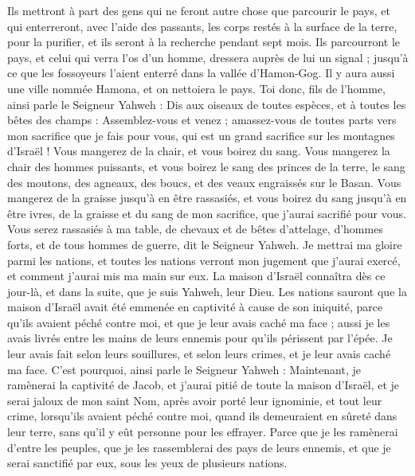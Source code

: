 \begin{multicols}{2}
Ils mettront à part des gens qui ne feront autre chose que parcourir le pays, et qui enterreront, avec l’aide des passants, les corps restés à la surface de la terre, pour la purifier, et ils seront à la recherche pendant sept mois.
Ils parcourront le pays, et celui qui verra l'os d'un homme, dressera auprès de lui un signal ; jusqu'à ce que les fossoyeurs l'aient enterré dans la vallée d'Hamon-Gog.
Il y aura aussi une ville nommée Hamona, et on nettoiera le pays.
Toi donc, fils de l’homme, ainsi parle le Seigneur Yahweh : Dis aux oiseaux de toutes espèces, et à toutes les bêtes des champs : Assemblez-vous et venez ; amassez-vous de toutes parts vers mon sacrifice que je fais pour vous, qui est un grand sacrifice sur les montagnes d'Israël ! Vous mangerez de la chair, et vous boirez du sang.
Vous mangerez la chair des hommes puissants, et vous boirez le sang des princes de la terre, le sang des moutons, des agneaux, des boucs, et des veaux engraissés sur le Basan.
Vous mangerez de la graisse jusqu’à en être rassasiés, et vous boirez du sang jusqu'à en être ivres, de la graisse et du sang de mon sacrifice, que j'aurai sacrifié pour vous.
Vous serez rassasiés à ma table, de chevaux et de bêtes d'attelage, d'hommes forts, et de tous hommes de guerre, dit le Seigneur Yahweh.
Je mettrai ma gloire parmi les nations, et toutes les nations verront mon jugement que j'aurai exercé, et comment j'aurai mis ma main sur eux.
La maison d'Israël connaîtra dès ce jour-là, et dans la suite, que je suis Yahweh, leur Dieu.
Les nations sauront que la maison d'Israël avait été emmenée en captivité à cause de son iniquité, parce qu'ils avaient péché contre moi, et que je leur avais caché ma face ; aussi je les avais livrés entre les mains de leurs ennemis pour qu’ils périssent par l'épée.
Je leur avais fait selon leurs souillures, et selon leurs crimes, et je leur avais caché ma face.
C'est pourquoi, ainsi parle le Seigneur Yahweh : Maintenant, je ramènerai la captivité de Jacob, et j'aurai pitié de toute la maison d'Israël, et je serai jaloux de mon saint Nom,
après avoir porté leur ignominie, et tout leur crime, lorsqu’ils avaient péché contre moi, quand ils demeuraient en sûreté dans leur terre, sans qu'il y eût personne pour les effrayer.
Parce que je les ramènerai d'entre les peuples, que je les rassemblerai des pays de leurs ennemis, et que je serai sanctifié par eux, sous les yeux de plusieurs nations.

\end{multicols}
